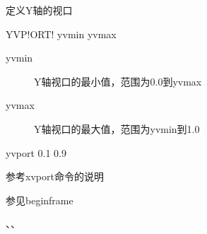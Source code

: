 \label{cmd:yvport}

定义Y轴的视口

\begin{SACSTX}
YVP!ORT! yvmin yvmax
\end{SACSTX}

\begin{description}
\item [yvmin] Y轴视口的最小值，范围为0.0到yvmax 
\item [yvmax] Y轴视口的最大值，范围为yvmin到1.0 
\end{description}

\begin{SACDFT}
yvport 0.1 0.9
\end{SACDFT}

参考xvport命令的说明

参见beginframe

、、
